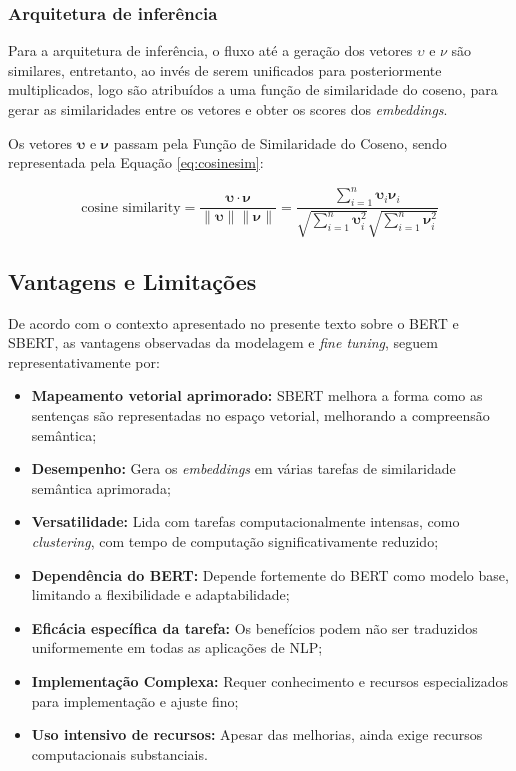 \subsubsection{Arquitetura de inferência}

Para a arquitetura de inferência, o fluxo até a geração dos vetores $\upsilon$ e $\nu$ são similares, entretanto, ao invés de serem unificados para posteriormente multiplicados, logo são atribuídos a uma função de similaridade do coseno, para gerar as similaridades entre os vetores e obter os scores dos \textit{embeddings}.

Os vetores \(\boldsymbol{\upsilon}\) e \(\boldsymbol{\nu}\) passam pela Função de Similaridade do Coseno, sendo representada pela Equação \ref{eq:cosinesim}: 

\begin{equation}
    \text{cosine similarity} = \frac{\boldsymbol{\upsilon} \cdot \boldsymbol{\nu}}{\|\boldsymbol{\upsilon}\| \|\boldsymbol{\nu}\|} = \frac{\sum_{i=1}^{n} \boldsymbol{\upsilon}_i \boldsymbol{\nu}_i}{\sqrt{\sum_{i=1}^{n} \boldsymbol{\upsilon}_i^2} \sqrt{\sum_{i=1}^{n} \boldsymbol{\nu}_i^2}}
    \label{eq:cosinesim}
\end{equation}

\subsection{Vantagens e Limitações}

De acordo com o contexto apresentado no presente texto sobre o BERT e SBERT, as vantagens observadas da modelagem e \textit{fine tuning}, seguem representativamente por:

\begin{itemize} 
    \item \textbf{Mapeamento vetorial aprimorado:} SBERT melhora a forma como as sentenças são representadas no espaço vetorial, melhorando a compreensão semântica;
    \item \textbf{Desempenho:} Gera os \textit{embeddings} em várias tarefas de similaridade semântica aprimorada;
    \item \textbf{Versatilidade:} Lida com tarefas computacionalmente intensas, como \textit{clustering}, com tempo de computação significativamente reduzido;
\end{itemize}


\begin{itemize} 
 \item \textbf{Dependência do BERT:} Depende fortemente do BERT como modelo base, limitando a flexibilidade e adaptabilidade;
 \item \textbf{Eficácia específica da tarefa:} Os benefícios podem não ser traduzidos uniformemente em todas as aplicações de NLP;
 \item \textbf{Implementação Complexa:} Requer conhecimento e recursos especializados para implementação e ajuste fino;
 \item \textbf{Uso intensivo de recursos:} Apesar das melhorias, ainda exige recursos computacionais substanciais.
\end{itemize}


